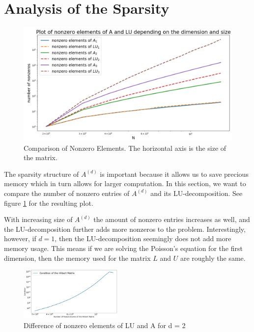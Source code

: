 \documentclass[refman]{article}
\theoremstyle{definition}
\begin{document}
\section{Analysis of the Sparsity}

\begin{figure}[h]
	\includegraphics[width=\linewidth]{graphics/sparsity.png}
	\caption{Comparison of Nonzero Elements. The horizontal axis is the size of the matrix.}
	\label{fig:boat1}
\end{figure}

The sparsity structure of \(A^{(d)}\) is important because it allows us to save precious memory which in turn allows for larger computation. In this section, we want to compare the number of nonzero entries of \(A^{(d)}\) and its LU-decomposition. See figure \ref{fig:boat1} for the resulting plot.

With increasing size of \(A^{(d)}\) the amount of nonzero entries increases as well, and the LU-decomposition further adds more nonzeros to the problem. Interestingly, however, if \(d = 1\), then the LU-decomposition seemingly does not add more memory usage. This means if we are solving the Poisson's equation for the first dimension, then the memory used for the matrix \(L\) and \(U\) are roughly the same.

\begin{figure}
	\includegraphics[width=0.45\textwidth]{graphics/hilbert_condition.png}
	\caption{Difference of nonzero elements of LU and A for d = 2}
	\label{fig:Line}
\end{figure}
\end{document}
